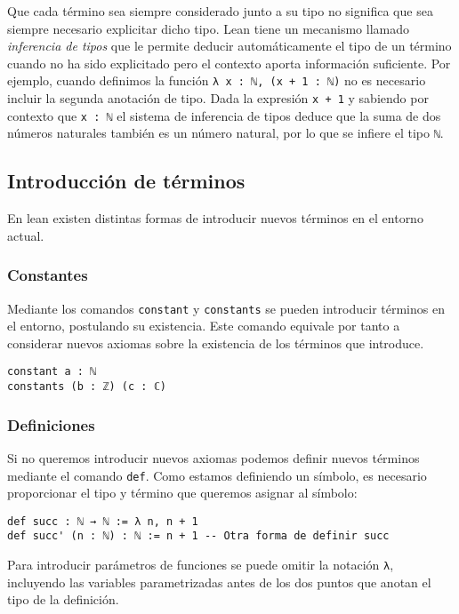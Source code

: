 
Que cada término sea siempre considerado junto a su tipo no significa que sea
siempre necesario explicitar dicho tipo. Lean tiene un mecanismo llamado
\textit{inferencia de tipos} que le permite deducir automáticamente el tipo de
un término cuando no ha sido explicitado pero el contexto aporta información
suficiente.
Por ejemplo, cuando definimos la función \lstinline{λ x : ℕ, (x + 1 : ℕ)} no es
necesario incluir la segunda anotación de tipo. Dada la expresión
\lstinline{x + 1} y sabiendo por contexto que \lstinline{x : ℕ} el sistema de
inferencia de tipos deduce que la suma de dos números naturales también es un
número natural, por lo que se infiere el tipo \lstinline{ℕ}.

\subsection{Introducción de términos}

En lean existen distintas formas de introducir nuevos términos en el entorno
actual.

\subsubsection*{Constantes}%

Mediante los comandos \lstinline{constant} y \lstinline{constants} se
pueden introducir términos en el entorno, postulando su existencia. Este comando
equivale por tanto a considerar nuevos axiomas sobre la existencia de los
términos que introduce.
\begin{lstlisting}
constant a : ℕ
constants (b : ℤ) (c : ℂ)
\end{lstlisting}


\subsubsection*{Definiciones}%
Si no queremos introducir nuevos axiomas podemos definir nuevos términos
mediante el comando \lstinline{def}. Como estamos definiendo un símbolo, es
necesario proporcionar el tipo y término que queremos asignar al símbolo:
\begin{lstlisting}
def succ : ℕ → ℕ := λ n, n + 1
def succ' (n : ℕ) : ℕ := n + 1 -- Otra forma de definir succ
\end{lstlisting}

Para introducir parámetros de funciones se puede omitir la notación
\lstinline{λ}, incluyendo las variables parametrizadas antes de los dos puntos
que anotan el tipo de la definición.

